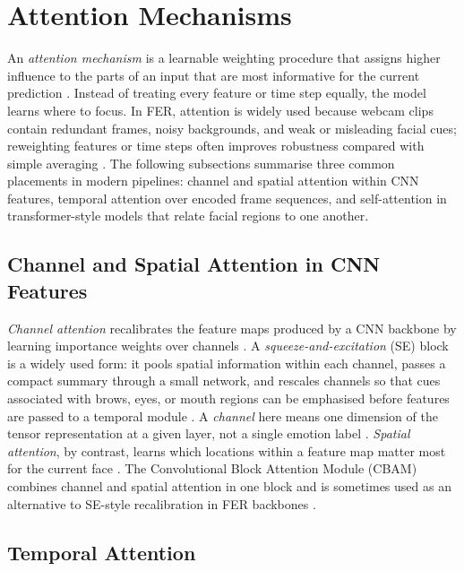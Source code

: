 \section{Attention Mechanisms}

An \emph{attention mechanism} is a learnable weighting procedure that assigns higher influence to the parts of an input that are most informative for the current prediction \cite{vaswani_attention_2017,mehta_three-dimensional_2022,su_leveraging_2024}. Instead of treating every feature or time step equally, the model learns where to focus. In FER, attention is widely used because webcam clips contain redundant frames, noisy backgrounds, and weak or misleading facial cues; reweighting features or time steps often improves robustness compared with simple averaging \cite{liu_dynamic_nodate,aly_revolutionizing_2025,lek_academic_2023}. The following subsections summarise three common placements in modern pipelines: channel and spatial attention within CNN features, temporal attention over encoded frame sequences, and self-attention in transformer-style models that relate facial regions to one another.

\subsection{Channel and Spatial Attention in CNN Features}\label{sec:bg:channel_attention}

\emph{Channel attention} recalibrates the feature maps produced by a CNN backbone by learning importance weights over channels \cite{hu_squeeze_2018,aly_revolutionizing_2025}. A \emph{squeeze-and-excitation} (SE) block is a widely used form: it pools spatial information within each channel, passes a compact summary through a small network, and rescales channels so that cues associated with brows, eyes, or mouth regions can be emphasised before features are passed to a temporal module \cite{hu_squeeze_2018,mehta_three-dimensional_2022}. A \emph{channel} here means one dimension of the tensor representation at a given layer, not a single emotion label \cite{liu_dynamic_nodate}. \emph{Spatial attention}, by contrast, learns which locations within a feature map matter most for the current face \cite{aly_revolutionizing_2025}. The Convolutional Block Attention Module (CBAM) combines channel and spatial attention in one block and is sometimes used as an alternative to SE-style recalibration in FER backbones \cite{aly_revolutionizing_2025,mehta_three-dimensional_2022}.

\subsection{Temporal Attention}\label{sec:bg:temporal_attention}

